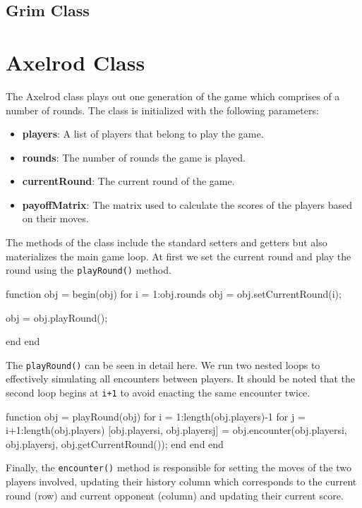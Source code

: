\subsection{Grim Class}

\section{Axelrod Class}
The Axelrod class plays out one generation of the game which comprises of a number of rounds. The class is initialized with the following parameters:
\begin{itemize}
    \item \textbf{players}: A list of players that belong to  play the game.
    \item \textbf{rounds}: The number of rounds the game is played.
    \item \textbf{currentRound}: The current round of the game.
    \item \textbf{payoffMatrix}: The matrix used to calculate the scores of the players based on their moves.
\end{itemize}
The methods of the class include the standard setters and getters but also materializes the main game loop. At first we set the current round and play the round using the \texttt{playRound()} method.
\begin{}
function obj = begin(obj)
    for i = 1:obj.rounds
        obj = obj.setCurrentRound(i);

        obj = obj.playRound();

    end
end
\end{}
The \texttt{playRound()} can be seen in detail here. We run two nested loops to effectively simulating all encounters between players. It should be noted that the second loop begins at \texttt{i+1} to avoid enacting the same encounter twice.
\begin{}
function obj = playRound(obj)
    for i = 1:length(obj.players)-1
        for j = i+1:length(obj.players)
            [obj.players{i}, obj.players{j}] = obj.encounter(obj.players{i}, obj.players{j}, obj.getCurrentRound());
        end
    end
end
\end{}
Finally, the \texttt{encounter()} method is responsible for setting the moves of the two players involved, updating their history column which corresponds to the current round (row) and current opponent (column) and updating their current score.  
